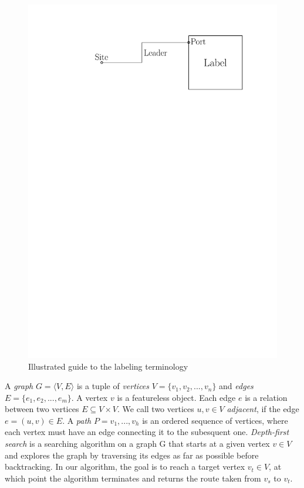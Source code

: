 \documentclass[11pt,a4paper]{vutinfth}
\begin{document}
\begin{figure}%
 \captionsetup{justification=centering, margin=0.75cm}
 \centering
  \includegraphics[scale=0.5]{IPE_TerminologyDrawing.pdf}
  \caption{Illustrated guide to the labeling terminology}
 \label{fig:term}
\end{figure}

A \emph{graph} $G=\langle V, E \rangle$ is a tuple of \emph{vertices} $V=\{v_1, v_2, ..., v_n\}$ and \emph{edges} $E=\{e_1, e_2, ..., e_m\}$. A vertex $v$ is a featureless object. %
 Each edge $e$ is a relation between two vertices $E \subseteq V\times V$. %
We call two vertices $u,v \in V$ \emph{adjacent}, if the edge $e=(u,v) \in E$.
 A \emph{path} $P=v_1, ..., v_h$ is an ordered sequence of vertices, where each vertex must have an edge connecting it to the subesquent one.
 \emph{Depth-first search} is a searching algorithm on a graph G that starts at a given vertex $v \in V$ and explores the graph by traversing its edges as far as possible before backtracking. In our algorithm, the goal is to reach a target vertex $v_t \in V$, at which point the algorithm terminates and returns the route taken from $v_s$ to $v_t$.
\end{document}
